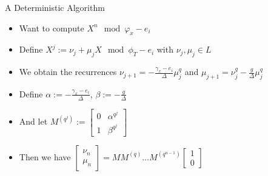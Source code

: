 \documentclass{beamer}
\begin{document}

\begin{frame}{A Deterministic Algorithm}
\begin{itemize}
    \item Want to compute $X^n \mod \varphi_{x} - e_i$
    \item Define $X^j := \nu_j + \mu_j X \mod \phi_{T} - e_i$ with $\nu_j, \mu_j \in L$
    \item We obtain the recurrences $\nu_{j+1} = -\frac{\gamma_x - e_i}{\Delta}\mu_{j}^q$ and $\mu_{j + 1} = \nu_j^q - \frac{g}{\Delta} \mu_j^q$
    
    \item Define $\alpha := -\frac{\gamma_x - e_i}{\Delta}$, $\beta := - \frac{g}{\Delta}$
    
    \item And let $M^{(q^j)} := \begin{bmatrix} 0 & \alpha^{q^j} \\ 1 & \beta^{q^j} \end{bmatrix}$
    
    \item Then we have $\begin{bmatrix} \nu_{n} \\ \mu_n  \end{bmatrix} = M M^{(q)} \ldots M^{(q^{n-1})}  \begin{bmatrix} 1 \\ 0  \end{bmatrix}$
    
    
    
\end{itemize}
    
\end{frame}

\end{document}

